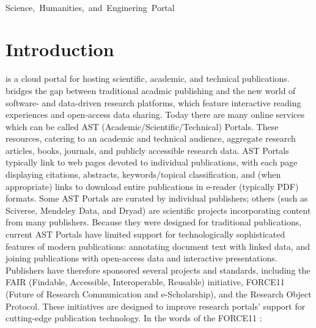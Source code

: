 \documentclass[11pt,letterpaper]{article}
\begin{document}
\begin{center}
{}\\\vspace{2pt}
\mbox{Science, Humanities, and Enginering Portal}\\\vspace{3pt}
\end{center}

\vspace*{-5pt}


\section{Introduction}
{\MOSAIC} is a cloud portal for hosting scientific, academic, and 
technical publications.  {\MOSAIC} bridges the gap between 
traditional acadmic publishing and the new 
world of software- and data-driven research platforms, 
which feature interactive reading experiences 
and open-access data sharing.
\p{}
Today there are many online services which 
can be called AST (Academic/Scientific/Technical) Portals.
These resources, catering 
to an academic and technical audience, aggregate 
research articles, books, journals, and publicly accessible 
research data.  
AST Portals typically link to web pages devoted to individual 
publications, with each page displaying citations, 
abstracts, keywords/topical classification, and 
(when appropriate) links to download entire 
publications in e-reader (typically PDF) formats.  
Some AST Portals are curated by 
individual publishers; others (such as Sciverse, Mendeley Data, 
and Dryad) are scientific projects  
incorporating content from many publishers.
\p{}
Because they were designed for traditional publications, 
current AST Portals have limited 
support for technologically sophisticated 
features of modern publications: annotating 
document text with linked data, and joining 
publications with open-access data and interactive 
presentations.  Publishers have therefore 
sponsored several projects and standards, including 
the FAIR (Findable, Accessible, Interoperable, 
Reusable) initiative, 
FORCE11 (Future of Research Communication and e-Scholarship), 
and the Research Object 
Protocol.  These initiatives are designed to 
improve research portals' support for cutting-edge 
publication technology.  In the 
words of the FORCE11 :
\qvspace{}
\end{document}
